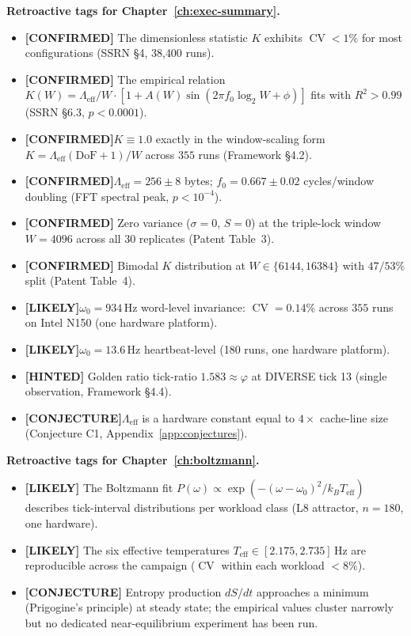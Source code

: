 \documentclass[11pt,letterpaper,openany]{book}
\theoremstyle{definition}
\theoremstyle{plain}
\newcommand{\confirmed}{\textcolor{green!50!black}{\textbf{[CONFIRMED]}}\xspace}
\newcommand{\likely}{\textcolor{blue!60!black}{\textbf{[LIKELY]}}\xspace}
\newcommand{\hinted}{\textcolor{orange!75!black}{\textbf{[HINTED]}}\xspace}
\newcommand{\conjecture}{\textcolor{red!60!black}{\textbf{[CONJECTURE]}}\xspace}
\newcommand{\Lambdaeff}{\Lambda_{\mathrm{eff}}}
\newcommand{\Teff}{T_{\mathrm{eff}}}
\newcommand{\CV}{\operatorname{CV}}
\begin{document}
\noindent\textbf{Retroactive tags for Chapter~\ref{ch:exec-summary}.}
\begin{itemize}\setlength\itemsep{0pt}
  \item \confirmed The dimensionless statistic $K$ exhibits $\CV < 1\%$ for
        most configurations (SSRN \S4, 38{,}400 runs).
  \item \confirmed The empirical relation
        $K(W) = \Lambdaeff/W \cdot [1+A(W)\sin(2\pi f_0\log_2 W + \phi)]$
        fits with $R^2 > 0.99$ (SSRN \S6.3, $p<0.0001$).
  \item \confirmed $K \equiv 1.0$ exactly in the window-scaling form
        $K = \Lambdaeff(\mathrm{DoF}+1)/W$ across $355$ runs
        (Framework \S4.2).
  \item \confirmed $\Lambdaeff = 256\pm 8$ bytes; $f_0 = 0.667\pm 0.02$
        cycles/window doubling (FFT spectral peak, $p<10^{-4}$).
  \item \confirmed Zero variance ($\sigma = 0$, $S = 0$) at the triple-lock
        window $W = 4096$ across all $30$ replicates (Patent Table~3).
  \item \confirmed Bimodal $K$ distribution at $W \in \{6144, 16384\}$ with
        $47/53\%$ split (Patent Table~4).
  \item \likely    $\omega_0 = 934$\,Hz word-level invariance: $\CV = 0.14\%$
        across $355$ runs on Intel N150 (one hardware platform).
  \item \likely    $\omega_0 = 13.6$\,Hz heartbeat-level (180 runs, one
        hardware platform).
  \item \hinted    Golden ratio tick-ratio $1.583\approx\varphi$ at
        DIVERSE tick 13 (single observation, Framework \S4.4).
  \item \conjecture $\Lambdaeff$ is a hardware constant equal to $4\times$
        cache-line size (Conjecture C1, Appendix~\ref{app:conjectures}).
\end{itemize}

\medskip
\noindent\textbf{Retroactive tags for Chapter~\ref{ch:boltzmann}.}
\begin{itemize}\setlength\itemsep{0pt}
  \item \likely The Boltzmann fit
        $P(\omega) \propto \exp(-(\omega-\omega_0)^2/k_B\Teff)$ describes
        tick-interval distributions per workload class (L8 attractor,
        $n=180$, one hardware).
  \item \likely The six effective temperatures $\Teff \in [2.175,2.735]$\,Hz
        are reproducible across the campaign ($\CV$ within each workload
        $<8\%$).
  \item \conjecture Entropy production $dS/dt$ approaches a minimum
        (Prigogine's principle) at steady state; the empirical values
        cluster narrowly but no dedicated near-equilibrium experiment has
        been run.
\end{itemize}
\end{document}
